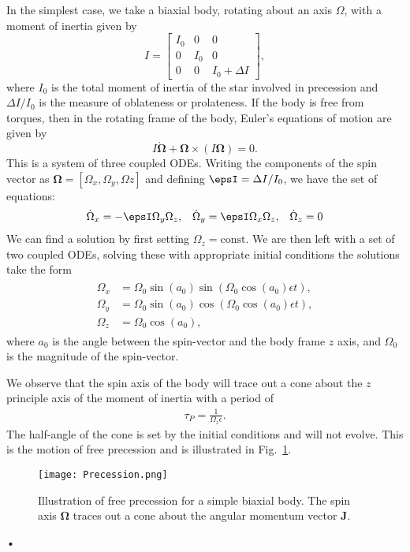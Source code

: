 In the simplest case, we take a biaxial body,
rotating about an axis $\Omega$, with a moment of inertia given by
\begin{equation}
    I = \left[\begin{array}{ccc}
            I_{0} & 0 & 0 \\
            0 & I_{0} & 0 \\
            0 & 0 & I_{0} + \Delta I
            \end{array}\right],
\end{equation}
where $I_0$ is the total moment of inertia of the star involved in precession
and $\Delta I/I_0$ is the measure of oblateness or prolateness. If the
body is free from torques, then in the rotating frame of the body, Euler's
equations of motion \citep{Landau1969} are given by
\begin{equation}
    I\dot{\bm{\Omega}} + \bm{\Omega} \times \left(I\bm{\Omega}\right)=0.
\end{equation}
This is a system of three coupled ODEs. Writing the components of the spin
vector as $\bm{\Omega} = [\Omega_{x}, \Omega_{y}, \Omega{z}]$ and
defining $\epsI = \Delta I / I_0$, we have the
set of equations:
\begin{align}
\dot{\Omega}_x = -\epsI \Omega_y\Omega_z, &&
\dot{\Omega}_y = \epsI \Omega_x \Omega_z, &&
\dot{\Omega}_z = 0
\end{align}
We can find a solution by first setting $\Omega_{z}=\mathrm{const}$.
We are then left with a set of
two coupled ODEs, solving these with appropriate initial conditions
the solutions take the form
\begin{align}
\begin{split}
    \Omega_{x} & = \Omega_{0}\sin(a_0)\sin\left(\Omega_{0}\cos(a_0)\epsilon t\right), \\
    \Omega_{y} & = \Omega_{0}\sin(a_0)\cos\left(\Omega_{0}\cos(a_0)\epsilon t\right),\\
    \Omega_{z} & = \Omega_0 \cos(a_0),
\label{eqn: free precession}
\end{split}
\end{align}
where $a_0$ is the angle between the spin-vector and the body frame $z$ axis, and
$\Omega_0$ is the magnitude of the spin-vector.

We observe that the spin axis of the body will trace out a cone about the $z$
principle axis of the moment of inertia with a period of
\begin{align}
\tau_P = \frac{1}{\Omega_{z}\epsilon}.
\label{eqn: tauP free}
\end{align}
The half-angle of the cone is set by the
initial conditions and will not evolve. This is the motion of free precession
and is illustrated in Fig.~\ref{fig: precession}.
\begin{figure}[htb]
\centering
\texttt{[image: Precession.png]}
\caption{Illustration of free precession for a simple biaxial body. The spin
    axis $\mathbf{\Omega}$ traces out a cone about the angular momentum vector $\mathbf{J}$.}
\label{fig: precession}
\end{figure}•

